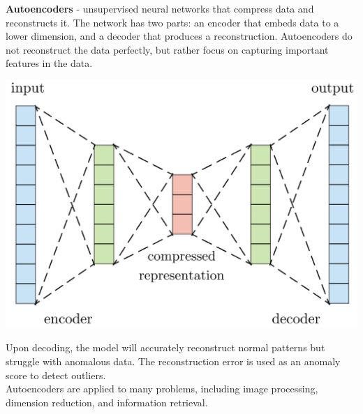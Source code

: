\documentclass[10pt,landscape]{article}
\begin{document}
\begin{multicols}{3}
\vspace{1mm}
\textbf{Autoencoders} - unsupervised neural networks that compress data and reconstructs it. The network has two parts: an encoder that embeds data to a lower dimension, and a decoder that produces a reconstruction. Autoencoders do not reconstruct the data perfectly, but rather focus on capturing important features in the data.
\begin{center}
\vspace{-2mm}
    \includegraphics[scale = .09]{images/autoencodeer1.JPG}
    \vspace{-2mm}
\end{center}
Upon decoding, the model will accurately reconstruct normal patterns but struggle with anomalous data. The reconstruction error is used as an anomaly score to detect outliers.\\
\smallskip
Autoencoders are applied to many problems, including image processing, dimension reduction, and information retrieval.


\end{multicols}
\end{document}
